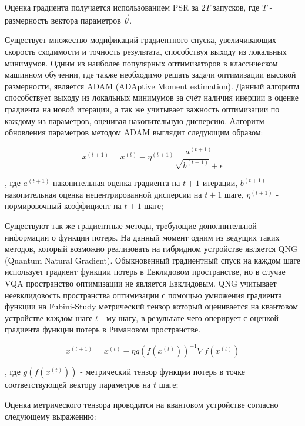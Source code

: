 \documentclass[12pt]{extarticle}
\begin{document}
\qquad Оценка градиента получается использованием PSR за $2T$ запусков, где $T$ - размерность вектора параметров $\vec \theta$. 

\qquad Существует множество модификаций градиентного спуска, увеличивающих скорость сходимости и точность результата, способствуя выходу из локальных минимумов. Одним из наиболее популярных оптимизаторов в классическом машинном обучении, где также необходимо решать задачи оптимизации высокой размерности, является ADAM (ADAptive Moment estimation). Данный алгоритм способствует выходу из локальных минимумов за счёт наличия инерции в оценке градиента на новой итерации, а так же учитывает важность оптимизации по каждому из параметров, оценивая накопительную дисперсию. Алгоритм обновления параметров методом ADAM выглядит следующим образом:

\begin{equation}
x^{(t+1)} = x^{(t)} - \eta^{(t+1)} \frac{a^{(t+1)} }{   \sqrt{b^{(t+1)}} + \epsilon}
\end{equation}

, где $a^{(t+1)}$ накопительная оценка градиента на $t+1$ итерации, $b^{(t+1)}$ накопительная оценка нецентрированной дисперсии на $t+1$ шаге, $\eta^{(t+1)}$ - нормировочный коэффициент на $t+1$ шаге;

\qquad Существуют так же градиентные методы, требующие дополнительной информации о функции потерь. На данный момент одним из ведущих таких методов, который возможно реализовать на гибридном устройстве является QNG (Quantum Natural Gradient). Обыкновенный градиентный спуск на каждом шаге использует градиент функции потерь в Евклидовом пространстве, но в случае VQA пространство оптимизации не является Евклидовым. QNG учитывает неевклидовость пространства оптимизации с помощью умножения градиента функции на Fubini-Study метрический тензор который оценивается на квантовом устройстве каждом шаге $t$ - му шагу, в результате чего оперирует с оценкой градиента функции потерь в Римановом пространстве.


\begin{equation}
x^{(t+1)} = x^{(t)} - \eta g ( f( x^{(t)} )  )^{-1} \nabla f( x^{(t)}  )
\end{equation}

, где $g ( f( x^{(t)} )  )$ - метрический тензор функции потерь в точке соответствующей вектору параметров на $t$ шаге;

\qquad Оценка метрического тензора проводится на квантовом устройстве согласно следующему выражению:
\end{document}
